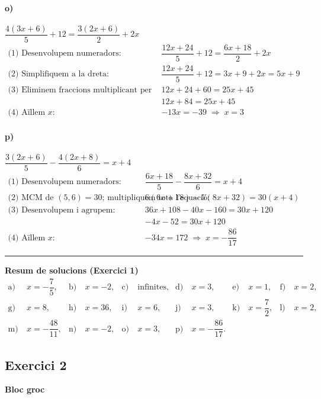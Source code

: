 \documentclass[11pt,a4paper]{article}
\begin{document}
\paragraph{o)} $\dfrac{4(3x + 6)}{5} + 12 = \dfrac{3(2x + 6)}{2} + 2x$
\[
\begin{aligned}
\text{(1) Desenvolupem numeradors: } & \dfrac{12x + 24}{5} + 12 = \dfrac{6x + 18}{2} + 2x \\
\text{(2) Simplifiquem a la dreta: } & \dfrac{12x + 24}{5} + 12 = 3x + 9 + 2x = 5x + 9 \\
\text{(3) Eliminem fraccions multiplicant per 5: } & 12x + 24 + 60 = 25x + 45 \\
& 12x + 84 = 25x + 45 \\
\text{(4) Aïllem } x: & -13x = -39 \;\Rightarrow\; \boxed{x = 3}
\end{aligned}
\]

\paragraph{p)} $\dfrac{3(2x + 6)}{5} - \dfrac{4(2x + 8)}{6} = x + 4$
\[
\begin{aligned}
\text{(1) Desenvolupem numeradors: } & \dfrac{6x + 18}{5} - \dfrac{8x + 32}{6} = x + 4 \\
\text{(2) MCM de }(5,6)=30 \text{; multipliquem tota l'equació: } &
6(6x + 18) - 5(8x + 32) = 30(x + 4) \\
\text{(3) Desenvolupem i agrupem: } & 36x + 108 - 40x - 160 = 30x + 120 \\
& -4x - 52 = 30x + 120 \\
\text{(4) Aïllem } x: & -34x = 172 \;\Rightarrow\; \boxed{x = -\dfrac{86}{17}}
\end{aligned}
\]

\bigskip\hrule\bigskip

\textbf{Resum de solucions (Exercici 1)}
\[
\begin{aligned}
\text{a)}&\ x = -\dfrac{7}{5}, &
\text{b)}&\ x = -2, &
\text{c)}&\ \text{infinites}, &
\text{d)}&\ x = 3, &
\text{e)}&\ x = 1, &
\text{f)}&\ x = 2, \\
\text{g)}&\ x = 8, &
\text{h)}&\ x = 36, &
\text{i)}&\ x = 6, &
\text{j)}&\ x = 3, &
\text{k)}&\ x = \dfrac{7}{2}, &
\text{l)}&\ x = 2, \\
\text{m)}&\ x = -\dfrac{48}{11}, &
\text{n)}&\ x = -2, &
\text{o)}&\ x = 3, & 
\text{p)}&\ x = -\dfrac{86}{17}.
\end{aligned}
\]

\subsection*{Exercici 2}
\textbf{Bloc groc}
\end{document}
